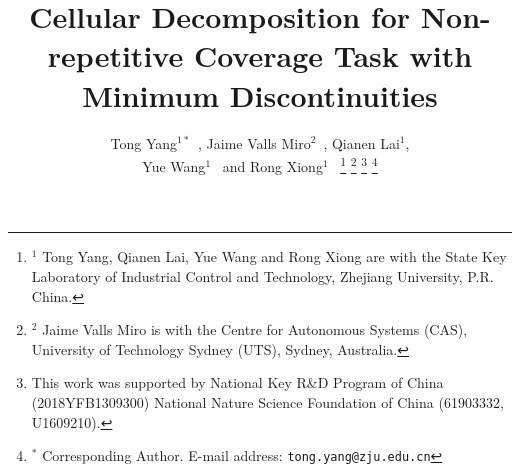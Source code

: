 \documentclass[journal]{IEEEtran}
\begin{document}
%
\title{Cellular Decomposition for Non-repetitive Coverage Task with Minimum Discontinuities}
%
%
%


\author{Tong Yang$^{1*}$~, Jaime Valls Miro$^2$~, Qianen Lai$^1$,\\ Yue Wang$^{1}$~ and Rong Xiong$^1$~
\thanks{$^1$ Tong Yang, Qianen Lai, Yue Wang and Rong Xiong are with the State Key 
Laboratory of Industrial Control and Technology, Zhejiang University, P.R. China. 
}
\thanks{$^2$ Jaime Valls Miro is with the Centre for Autonomous Systems (CAS), University of Technology Sydney (UTS), Sydney, Australia.}
\thanks{This work was supported by National Key R\&D Program of China (2018YFB1309300) National Nature Science Foundation of China (61903332, U1609210).}
\thanks{$^*$ Corresponding Author. \newline \indent
E-mail address: {\tt\small tong.yang@zju.edu.cn}}
}
\end{document}
